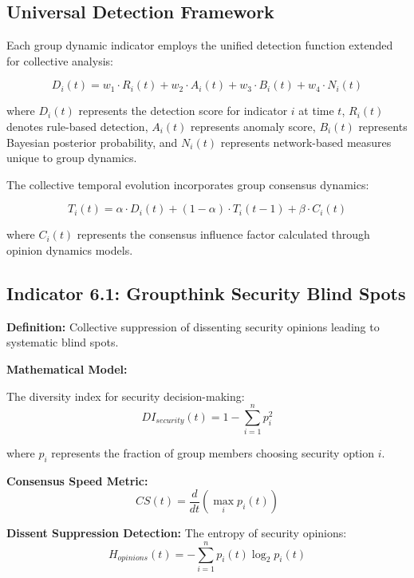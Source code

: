 \documentclass[11pt,a4paper]{article}
\begin{document}
\subsection{Universal Detection Framework}

Each group dynamic indicator employs the unified detection function extended for collective analysis:

\begin{equation}
D_i(t) = w_1 \cdot R_i(t) + w_2 \cdot A_i(t) + w_3 \cdot B_i(t) + w_4 \cdot N_i(t)
\end{equation}

where $D_i(t)$ represents the detection score for indicator $i$ at time $t$, $R_i(t)$ denotes rule-based detection, $A_i(t)$ represents anomaly score, $B_i(t)$ represents Bayesian posterior probability, and $N_i(t)$ represents network-based measures unique to group dynamics.

The collective temporal evolution incorporates group consensus dynamics:

\begin{equation}
T_i(t) = \alpha \cdot D_i(t) + (1-\alpha) \cdot T_i(t-1) + \beta \cdot C_i(t)
\end{equation}

where $C_i(t)$ represents the consensus influence factor calculated through opinion dynamics models.

\subsection{Indicator 6.1: Groupthink Security Blind Spots}

\textbf{Definition:} Collective suppression of dissenting security opinions leading to systematic blind spots.

\textbf{Mathematical Model:}

The diversity index for security decision-making:
\begin{equation}
DI_{security}(t) = 1 - \sum_{i=1}^n p_i^2
\end{equation}

where $p_i$ represents the fraction of group members choosing security option $i$.

\textbf{Consensus Speed Metric:}
\begin{equation}
CS(t) = \frac{d}{dt}\left(\max_i p_i(t)\right)
\end{equation}

\textbf{Dissent Suppression Detection:}
The entropy of security opinions:
\begin{equation}
H_{opinions}(t) = -\sum_{i=1}^n p_i(t) \log_2 p_i(t)
\end{equation}
\end{document}
